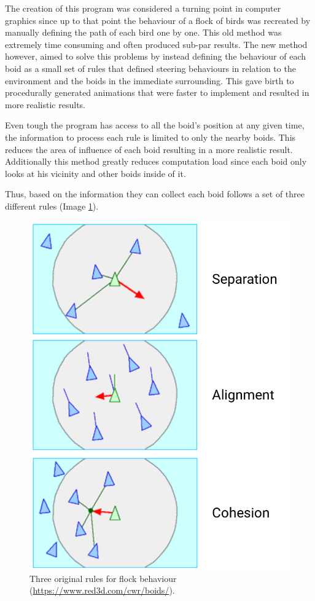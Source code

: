 \documentclass[sigconf]{acmart}
\begin{document}
The creation of this program was considered a turning point in computer graphics
since up to that point the behaviour of a flock of birds was recreated by manually
defining the path of each bird one by one. This old method was extremely time
consuming and often produced sub-par results. The new method however, aimed to solve this
problems by instead defining the behaviour of each boid as a small set of rules that
defined steering behaviours in relation to the environment and the boids in the
immediate surrounding. This gave birth to procedurally generated animations that were
faster to implement and resulted in more realistic results.

Even tough the program has access to all the boid's position at any given time, the
information to process each rule is limited to only the nearby boids. This reduces 
the area of influence of each boid resulting in a more realistic result.
Additionally this method greatly reduces computation load since each boid only
looks at his vicinity and other boids inside of it.

Thus, based on the information they can collect each boid follows a set of three
different rules (Image \ref{fig:boid_rules}).

\begin{figure}[h]
  \centering
  \includegraphics[width=0.95\linewidth]{images/three_boid_rules.png}
  \caption{Three original rules for flock behaviour (\url{https://www.red3d.com/cwr/boids/}).}
  \label{fig:boid_rules}
\end{figure}
\end{document}
